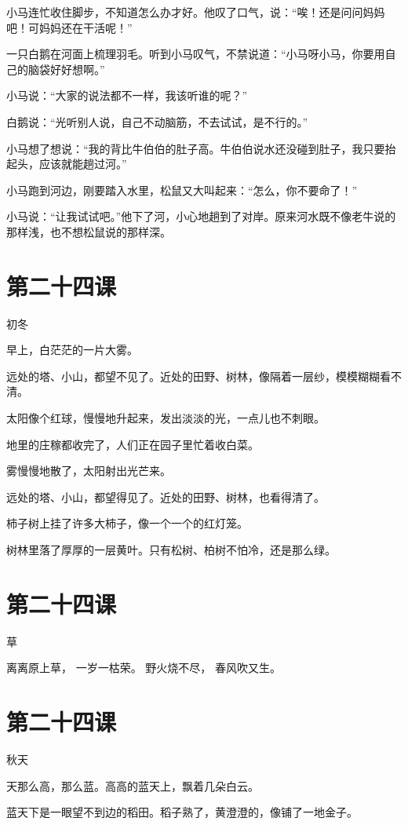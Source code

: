 \documentclass[12pt,UTF8]{ctexbook}
\begin{document}
小马连忙收住脚步，不知道怎么办才好。他叹了口气，说：“唉！还是问问妈妈吧！可妈妈还在干活呢！”

一只白鹅在河面上梳理羽毛。听到小马叹气，不禁说道：“小马呀小马，你要用自己的脑袋好好想啊。”

小马说：“大家的说法都不一样，我该听谁的呢？”

白鹅说：“光听别人说，自己不动脑筋，不去试试，是不行的。”

小马想了想说：“我的背比牛伯伯的肚子高。牛伯伯说水还没碰到肚子，我只要抬起头，应该就能趟过河。”

小马跑到河边，刚要踏入水里，松鼠又大叫起来：“怎么，你不要命了！”

小马说：“让我试试吧。”他下了河，小心地趟到了对岸。原来河水既不像老牛说的那样浅，也不想松鼠说的那样深。

\section{第二十四课}

初冬

早上，白茫茫的一片大雾。

远处的塔、小山，都望不见了。近处的田野、树林，像隔着一层纱，模模糊糊看不清。

太阳像个红球，慢慢地升起来，发出淡淡的光，一点儿也不刺眼。

地里的庄稼都收完了，人们正在园子里忙着收白菜。

雾慢慢地散了，太阳射出光芒来。

远处的塔、小山，都望得见了。近处的田野、树林，也看得清了。

柿子树上挂了许多大柿子，像一个一个的红灯笼。

树林里落了厚厚的一层黄叶。只有松树、柏树不怕冷，还是那么绿。

\section{第二十四课}

草

离离原上草，
一岁一枯荣。
野火烧不尽，
春风吹又生。

\section{第二十四课}

秋天

天那么高，那么蓝。高高的蓝天上，飘着几朵白云。

蓝天下是一眼望不到边的稻田。稻子熟了，黄澄澄的，像铺了一地金子。
\end{document}
